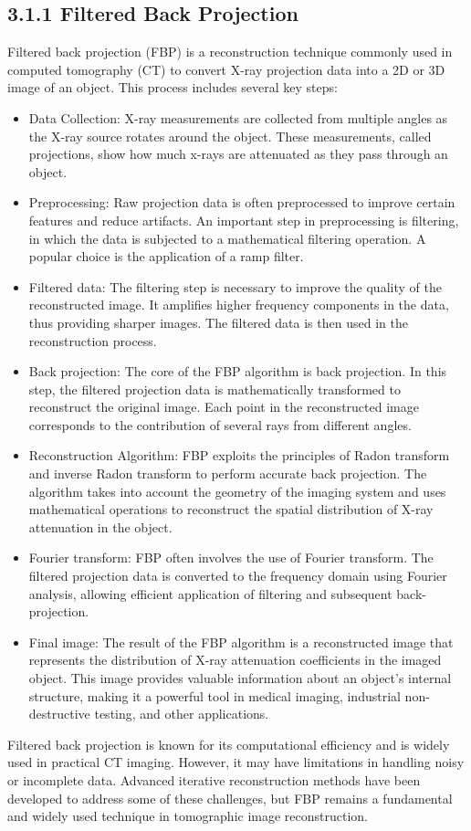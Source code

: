 \documentclass[12pt,fleqn]{article}
\begin{document}
\subsection{3.1.1 Filtered Back Projection}
Filtered back projection (FBP) is a reconstruction technique commonly used in computed tomography (CT) to convert X-ray projection data into a 2D or 3D image of an object. This process includes several key steps:
\begin{itemize}
\item Data Collection: X-ray measurements are collected from multiple angles as the X-ray source rotates around the object. These measurements, called projections, show how much x-rays are attenuated as they pass through an object.
\item Preprocessing: Raw projection data is often preprocessed to improve certain features and reduce artifacts. An important step in preprocessing is filtering, in which the data is subjected to a mathematical filtering operation. A popular choice is the application of a ramp filter.
\item Filtered data: The filtering step is necessary to improve the quality of the reconstructed image. It amplifies higher frequency components in the data, thus providing sharper images. The filtered data is then used in the reconstruction process.
\item Back projection: The core of the FBP algorithm is back projection. In this step, the filtered projection data is mathematically transformed to reconstruct the original image. Each point in the reconstructed image corresponds to the contribution of several rays from different angles.
\item Reconstruction Algorithm: FBP exploits the principles of Radon transform and inverse Radon transform to perform accurate back projection. The algorithm takes into account the geometry of the imaging system and uses mathematical operations to reconstruct the spatial distribution of X-ray attenuation in the object.
\item Fourier transform: FBP often involves the use of Fourier transform. The filtered projection data is converted to the frequency domain using Fourier analysis, allowing efficient application of filtering and subsequent back-projection.

\item Final image: The result of the FBP algorithm is a reconstructed image that represents the distribution of X-ray attenuation coefficients in the imaged object. This image provides valuable information about an object's internal structure, making it a powerful tool in medical imaging, industrial non-destructive testing, and other applications.
\end{itemize}
 Filtered back projection is known for its computational efficiency and is widely used in practical CT imaging. However, it may have limitations in handling noisy or incomplete data. Advanced iterative reconstruction methods have been developed to address some of these challenges, but FBP remains a fundamental and widely used technique in tomographic image reconstruction.
\end{document}
